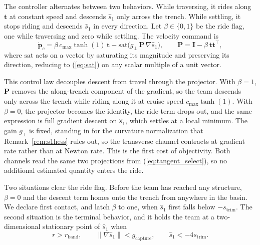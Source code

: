 \documentclass[lettersize,journal]{IEEEtran}
\begin{document}
The controller alternates between two behaviors. While traversing, it
rides along $\mathbf{t}$ at constant speed and descends $\hat{s}_1$ only
across the trench. While settling, it stops riding and descends
$\hat{s}_1$ in every direction. Let $\beta \in \{0,1\}$ be the ride flag,
one while traversing and zero while settling. The velocity command is
\begin{equation}
    \dot{\mathbf{p}}_c =
    \beta\,c_{\max}\tanh(1)\,\mathbf{t}
    - \mathrm{sat}\!\bigl(g_\perp\,\mathbf{P}\,\nabla\hat{s}_1\bigr),
    \qquad
    \mathbf{P} = \mathbf{I} - \beta\,\mathbf{t}\mathbf{t}^\top,
    \label{eq:oecs_law}
\end{equation}
where $\mathrm{sat}$ acts on a vector by saturating its magnitude and
preserving its direction, reducing to (\ref{eq:sat}) on any scalar
multiple of a unit vector.

This control law decouples descent from travel through the projector.
With $\beta = 1$, $\mathbf{P}$ removes the along-trench component of the
gradient, so the team descends only across the trench while riding along
it at cruise speed $c_{\max}\tanh(1)$. With $\beta = 0$, the projector
becomes the identity, the ride term drops out, and the same expression
is full gradient descent on $\hat{s}_1$, which settles at a local
minimum. The gain $g_\perp$ is fixed, standing in for the curvature
normalization that Remark~\ref{rem:s1hess} rules out, so the transverse
channel contracts at gradient rate rather than at Newton rate. This is
the first cost of objectivity. Both channels read the same two
projections from (\ref{eq:tangent_select}), so no additional estimated
quantity enters the ride.

Two situations clear the ride flag. Before the team has reached any
structure, $\beta = 0$ and the descent term homes onto the trench from
anywhere in the basin. We declare first contact, and latch $\beta$ to
one, when $\hat{s}_1$ first falls below $-s_{\mathrm{trim}}$. The second
situation is the terminal behavior, and it holds the team at a
two-dimensional stationary point of $\hat{s}_1$ when
\begin{equation}
    r > r_{\mathrm{band}}, \qquad
    \lVert\nabla\hat{s}_1\rVert < g_{\mathrm{capture}}, \qquad
    \hat{s}_1 < -4 s_{\mathrm{trim}}.
    \label{eq:capture_test}
\end{equation}
\end{document}
